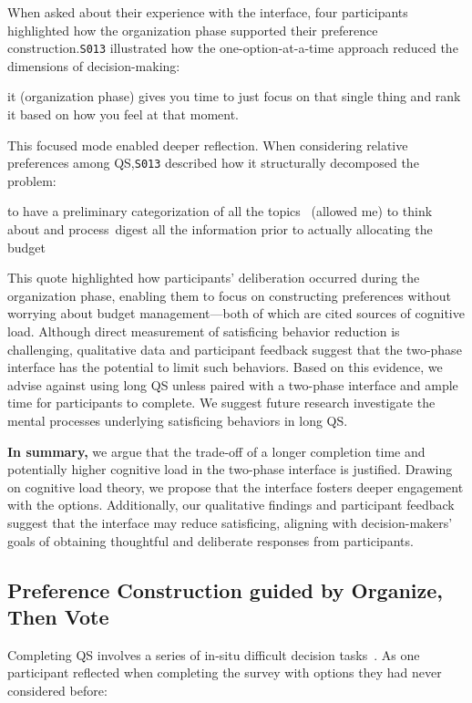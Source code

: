 When asked about their experience with the interface, four participants highlighted how the organization phase supported their preference construction.\texttt{S013} illustrated how the one-option-at-a-time approach reduced the dimensions of decision-making:

\begin{displayquote}  
\bracketellipsis it (organization phase) gives you time to just focus on that single thing and rank it based on how you feel at that moment. \hfill{}  
\end{displayquote}  

This focused mode enabled deeper reflection. When considering relative preferences among QS,\texttt{S013} described how it structurally decomposed the problem:

\begin{displayquote}  
\bracketellipsis to have a preliminary categorization of all the topics ~\bracketellipsis (allowed me) to think about and process~\bracketellipsis digest all the information prior to actually allocating the budget~\bracketellipsis \hfill{}  
\end{displayquote}  

This quote highlighted how participants' deliberation occurred during the organization phase, enabling them to focus on constructing preferences without worrying about budget management—both of which are cited sources of cognitive load. Although direct measurement of satisficing behavior reduction is challenging, qualitative data and participant feedback suggest that the two-phase interface has the potential to limit such behaviors. Based on this evidence, we advise against using long QS unless paired with a two-phase interface and ample time for participants to complete. We suggest future research investigate the mental processes underlying satisficing behaviors in long QS. 

\textbf{In summary,} we argue that the trade-off of a longer completion time and potentially higher cognitive load in the two-phase interface is justified. Drawing on cognitive load theory, we propose that the interface fosters deeper engagement with the options. Additionally, our qualitative findings and participant feedback suggest that the interface may reduce satisficing, aligning with decision-makers' goals of obtaining thoughtful and deliberate responses from participants.

\subsection{Preference Construction guided by Organize, Then Vote}
Completing QS involves a series of in-situ difficult decision tasks~\textcite{lichtensteinConstructionPreference2006}. As one participant reflected when completing the survey with options they had never considered before:


